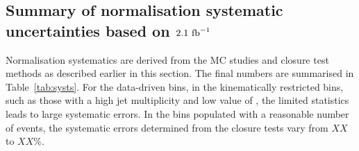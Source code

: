 %
%
%

\subsection{Summary of normalisation systematic uncertainties based on $2.1~\ifb$}
\label{sec:closure-test-syst}

Normalisation systematics are derived from the MC studies and closure
test methods as described earlier in this section. The final numbers are summarised
in Table~\ref{tab:systs}. For the data-driven bins, in the kinematically restricted bins, such
as those with a high jet multiplicity and low value of \scalht, the
limited statistics leads to large systematic errors. In the bins populated 
with a reasonable number of events, the
systematic errors determined from the closure tests vary from $XX$ to
$XX\%$.

